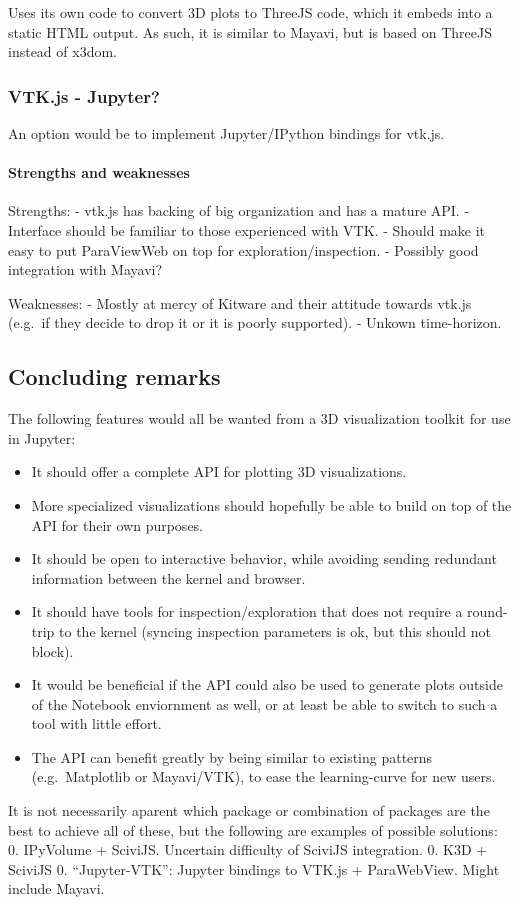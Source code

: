 Uses its own code to convert 3D plots to ThreeJS code, which it embeds
into a static HTML output. As such, it is similar to Mayavi, but is
based on ThreeJS instead of x3dom.

\subsubsection{VTK.js - Jupyter?}

An option would be to implement Jupyter/IPython bindings for vtk.js.

\paragraph{Strengths and weaknesses}

Strengths: - vtk.js has backing of big organization and has a mature
API. - Interface should be familiar to those experienced with VTK. -
Should make it easy to put ParaViewWeb on top for
exploration/inspection. - Possibly good integration with Mayavi?

Weaknesses: - Mostly at mercy of Kitware and their attitude towards
vtk.js (e.g.~if they decide to drop it or it is poorly supported). -
Unkown time-horizon.

\subsection{Concluding remarks}

The following features would all be wanted from a 3D visualization
toolkit for use in Jupyter:

\begin{itemize}
\tightlist
\item
  It should offer a complete API for plotting 3D visualizations.
\item
  More specialized visualizations should hopefully be able to build on
  top of the API for their own purposes.
\item
  It should be open to interactive behavior, while avoiding sending
  redundant information between the kernel and browser.
\item
  It should have tools for inspection/exploration that does not require
  a round-trip to the kernel (syncing inspection parameters is ok, but
  this should not block).
\item
  It would be beneficial if the API could also be used to generate plots
  outside of the Notebook enviornment as well, or at least be able to
  switch to such a tool with little effort.
\item
  The API can benefit greatly by being similar to existing patterns
  (e.g.~Matplotlib or Mayavi/VTK), to ease the learning-curve for new
  users.
\end{itemize}

It is not necessarily aparent which package or combination of packages
are the best to achieve all of these, but the following are examples of
possible solutions: 0. IPyVolume + SciviJS. Uncertain difficulty of
SciviJS integration. 0. K3D + SciviJS 0. ``Jupyter-VTK'': Jupyter
bindings to VTK.js + ParaWebView. Might include Mayavi.
